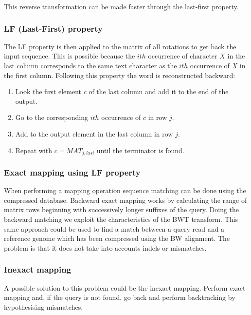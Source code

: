         This reverse transformation can be made faster through the last-first property.

        \subsubsection{LF (Last-First) property}
        The LF property is then applied to the matrix of all rotations to get back the input sequence.
        This is possible because the $ith$ occurrence of character $X$ in the last column corresponds to the same text character as the $ith$ occurrence of $X$ in the first column.
        Following this property the word is reconstructed backward:

        \begin{multicols}{2}
            \begin{enumerate}
                \item Look the first element $c$ of the last column and add it to the end of the output.
                \item Go to the corresponding $ith$ occurrence of $c$ in row $j$.
                \item Add to the output element in the last column in row $j$.
                \item Repeat with $c = MAT_{j,last}$ until the terminator is found.
            \end{enumerate}
        \end{multicols}

        \subsubsection{Exact mapping using LF property}
        When performing a mapping operation sequence matching can be done using the compressed database.
        Backward exact mapping works by calculating the range of matrix rows beginning with successively longer suffixes of the query.
        Doing the backward matching we exploit the characteristics of the BWT transform.
        This same approach could be used to find a match between a query read and a reference genome which has been compressed using the BW alignment.
        The problem is that it does not take into accounts indels or mismatches.

        \subsubsection{Inexact mapping}
        A possible solution to this problem could be the inexact mapping.
        Perform exact mapping and, if the query is not found, go back and perform backtracking by hypothesising mismatches.

